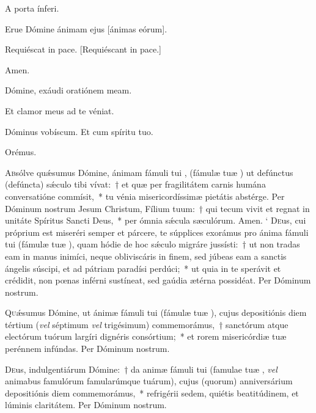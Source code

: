 \documentclass[vesperale_romanum]{subfiles}
\begin{document}

\vv A porta ínferi.

\rr Erue Dómine ánimam ejus [ánimas eórum].

\vv Requiéscat in pace. [Requiéscant in pace.]

\rr Amen.

\vv Dómine, exáudi oratiónem meam.

\rr Et clamor meus ad te véniat.

\vv Dóminus vobíscum. \rr Et cum spíritu tuo.

{\centering Orémus.\par}


\oratio

\lettrine{A}{b}sólve quǽsumus Dómine, ánimam fámuli tui \nomen{}, (fámulæ tuæ \nomen{}) ut defúnctus (defúncta) sǽculo tibi vívat:~† et quæ per fragilitátem carnis humána conversatióne commísit,~* tu vénia misericordíssimæ pietátis abstérge. Per Dóminum nostrum Jesum Christum, Fílium tuum:~† qui tecum vivit et regnat in unitáte Spíritus Sancti Deus,~* per ómnia sǽcula sæculórum. \rr Amen.
`
\lettrine{D}{e}us, cui próprium est miseréri semper et párcere, te súpplices exorámus pro ánima fámuli tui \nomen{} (fámulæ tuæ \nomen{}),
quam hódie de hoc sǽculo migráre jussísti:~† ut non tradas eam in manus inimíci,
neque obliviscáris in finem, sed júbeas eam a sanctis ángelis súscipi, et ad pátriam paradísi perdúci;~* 
ut quia in te sperávit et crédidit, non pœnas inférni sustíneat, sed gaúdia ætérna possidéat. Per Dóminum nostrum.



\lettrine{Q}{u}ǽsumus Dómine, ut ánimæ fámuli tui \nomen{} (fámulæ tuæ \nomen{}), cujus depositiónis diem tértium (\textit{vel} séptimum \textit{vel} trigésimum) commemorámus,~† sanctórum atque electórum tuórum largíri dignéris consórtium;~* et rorem misericórdiæ tuæ perénnem infúndas. Per Dóminum nostrum.


\lettrine{D}{e}us, indulgentiárum Dómine:~† da animæ fámuli tui \nomen{}
(famulae tuæ \nomen, \textit{vel} animabus famulórum famularúmque
tuárum), cujus (quorum) anniversárium depositiónis diem commemorámus,~* refrigérii sedem, quiétis beatitúdinem, et lúminis
claritátem. Per Dóminum nostrum.
\end{document}
